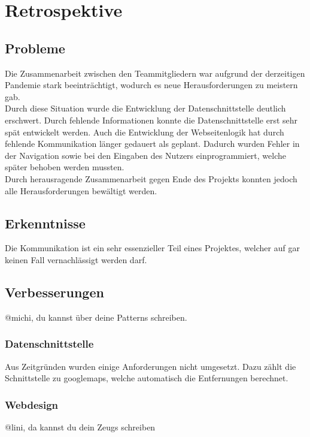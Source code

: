 \chapter{Retrospektive}
\section{Probleme}
Die Zusammenarbeit zwischen den Teammitgliedern war aufgrund der derzeitigen Pandemie stark beeinträchtigt, wodurch es neue Herausforderungen zu meistern gab.\\

Durch diese Situation wurde die Entwicklung der Datenschnittstelle deutlich erschwert. Durch fehlende Informationen konnte die Datenschnittstelle erst sehr spät entwickelt werden. Auch die Entwicklung der Webseitenlogik hat durch fehlende Kommunikation länger gedauert als geplant. Dadurch wurden Fehler in der Navigation sowie bei den Eingaben des Nutzers einprogrammiert, welche später behoben werden mussten.\\

Durch herausragende Zusammenarbeit gegen Ende des Projekts konnten jedoch alle Herausforderungen bewältigt werden.
\section{Erkenntnisse}
Die Kommunikation ist ein sehr essenzieller Teil eines Projektes, welcher auf gar keinen Fall vernachlässigt werden darf.
\section{Verbesserungen}
@michi, du kannst über deine Patterns schreiben.

\subsection{Datenschnittstelle}
Aus Zeitgründen wurden einige Anforderungen nicht umgesetzt. Dazu zählt die Schnittstelle zu \Gls{googlemaps}, welche automatisch die Entfernungen berechnet.

\subsection{Webdesign}
@lini, da kannst du dein Zeugs schreiben